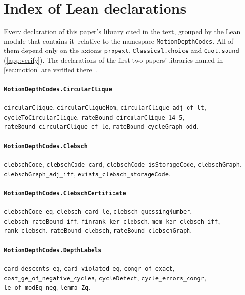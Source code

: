 \section{Index of Lean declarations}\label{app:index}

Every declaration of this paper's library cited in the text, grouped by the Lean module that contains it, relative to the namespace
\texttt{MotionDepthCodes}. All of them depend only on the axioms \texttt{propext}, \texttt{Classical.choice} and
\texttt{Quot.sound} (\cref{app:verify}). The declarations of the first two papers' libraries named in
\cref{sec:motion} are verified there~\cite{FirstPaper2026,SecondPaper2026}.

\paragraph{\texttt{MotionDepthCodes.CircularClique}}
{\small\raggedright \texttt{circularClique}, \texttt{circularCliqueHom}, \texttt{circularClique\_adj\_of\_lt}, \texttt{cycleToCircularClique}, \texttt{rateBound\_circularClique\_14\_5}, \texttt{rateBound\_circularClique\_of\_le}, \texttt{rateBound\_cycleGraph\_odd}.\par}

\paragraph{\texttt{MotionDepthCodes.Clebsch}}
{\small\raggedright \texttt{clebschCode}, \texttt{clebschCode\_card}, \texttt{clebschCode\_isStorageCode}, \texttt{clebschGraph}, \texttt{clebschGraph\_adj\_iff}, \texttt{exists\_clebsch\_storageCode}.\par}

\paragraph{\texttt{MotionDepthCodes.ClebschCertificate}}
{\small\raggedright \texttt{clebschCode\_eq}, \texttt{clebsch\_card\_le}, \texttt{clebsch\_guessingNumber}, \texttt{clebsch\_rateBound\_iff}, \texttt{finrank\_ker\_clebsch}, \texttt{mem\_ker\_clebsch\_iff}, \texttt{rank\_clebsch}, \texttt{rateBound\_clebsch}, \texttt{rateBound\_clebschGraph}.\par}

\paragraph{\texttt{MotionDepthCodes.DepthLabels}}
{\small\raggedright \texttt{card\_descents\_eq}, \texttt{card\_violated\_eq}, \texttt{congr\_of\_exact}, \texttt{cost\_ge\_of\_negative\_cycles}, \texttt{cycleDefect}, \texttt{cycle\_errors\_congr}, \texttt{le\_of\_modEq\_neg}, \texttt{lemma\_Zq}.\par}

